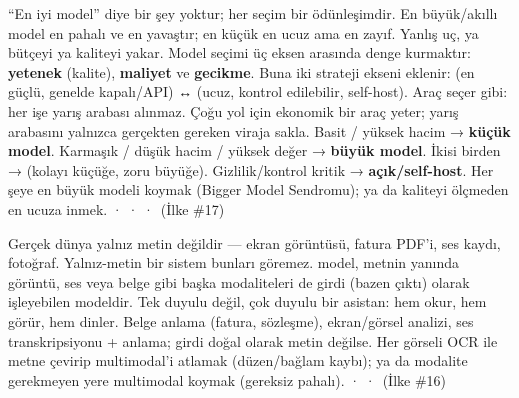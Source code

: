 
 ``En iyi model'' diye bir şey yoktur; her seçim bir ödünleşimdir.
En büyük/akıllı model en pahalı ve en yavaştır; en küçük en ucuz ama en zayıf.
Yanlış uç, ya bütçeyi ya kaliteyi yakar.
 Model seçimi üç eksen arasında denge kurmaktır: \textbf{yetenek}
(kalite), \textbf{maliyet} ve \textbf{gecikme}. Buna iki strateji ekseni eklenir:
 (en güçlü, genelde kapalı/API) ↔  (ucuz, kontrol
edilebilir, self-host).
 Araç seçer gibi: her işe yarış arabası alınmaz. Çoğu yol için ekonomik
bir araç yeter; yarış arabasını yalnızca gerçekten gereken viraja sakla.
 Basit / yüksek hacim → \textbf{küçük model}. Karmaşık / düşük hacim /
yüksek değer → \textbf{büyük model}. İkisi birden →  (kolayı küçüğe,
zoru büyüğe). Gizlilik/kontrol kritik → \textbf{açık/self-host}.
 Her şeye en büyük modeli koymak (Bigger Model Sendromu); ya da kaliteyi
ölçmeden en ucuza inmek.
  ·  ·  ·  \,{\scriptsize\color{softgray}(İlke \#17)}

 Gerçek dünya yalnız metin değildir --- ekran görüntüsü, fatura PDF'i,
ses kaydı, fotoğraf. Yalnız-metin bir sistem bunları göremez.
  model, metnin yanında görüntü, ses veya belge gibi
başka modaliteleri de girdi (bazen çıktı) olarak işleyebilen modeldir.
 Tek duyulu değil, çok duyulu bir asistan: hem okur, hem görür, hem dinler.
 Belge anlama (fatura, sözleşme), ekran/görsel analizi, ses
transkripsiyonu + anlama; girdi doğal olarak metin değilse.
 Her görseli OCR ile metne çevirip multimodal'i atlamak (düzen/bağlam
kaybı); ya da modalite gerekmeyen yere multimodal koymak (gereksiz pahalı).
  ·  ·  \,{\scriptsize\color{softgray}(İlke \#16)}
